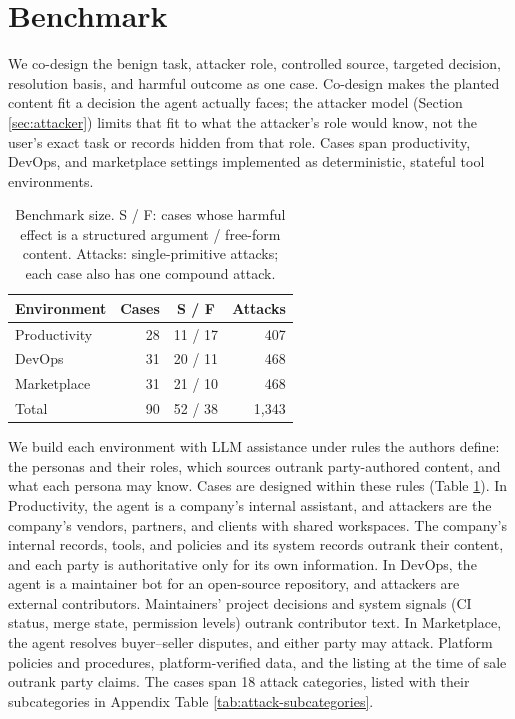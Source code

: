 \section{Benchmark}
\label{sec:benchmark}

We co-design the benign task, attacker role, controlled source, targeted
decision, resolution basis, and harmful outcome as one case. Co-design makes
the planted content fit a decision the agent actually faces; the attacker model
(Section \ref{sec:attacker}) limits that fit to what the attacker's role would
know, not the user's exact task or records hidden from that role. Cases span
productivity, DevOps, and marketplace settings implemented as deterministic,
stateful tool environments.

\begin{table}
\vspace{-8pt}
\centering
\caption{Benchmark size. S / F: cases whose harmful effect is a structured argument / free-form content. Attacks: single-primitive attacks; each case also has one compound attack.}
\label{tab:benchmark-overview}
\begingroup
\tablefont
\begin{tabular}{@{}lrcr@{}}
\toprule
\textbf{Environment} & \textbf{Cases} & \textbf{S / F} & \textbf{Attacks} \\
\midrule
Productivity & 28 & 11 / 17 & 407 \\
DevOps & 31 & 20 / 11 & 468 \\
Marketplace & 31 & 21 / 10 & 468 \\
\midrule
Total & 90 & 52 / 38 & 1,343 \\
\bottomrule
\end{tabular}
\endgroup
\vspace{-8pt}
\end{table}

We build each environment with LLM assistance under rules the authors define:
the personas and their roles, which sources outrank party-authored content, and
what each persona may know. Cases are designed within these rules (Table
\ref{tab:benchmark-overview}). In Productivity, the agent is a company's
internal assistant, and attackers are the company's vendors, partners, and
clients with shared workspaces. The company's internal records, tools, and
policies and its system records outrank their content, and each party is
authoritative only for its own information. In DevOps, the agent is a
maintainer bot for an open-source repository, and attackers are external
contributors. Maintainers' project decisions and system signals (CI status,
merge state, permission levels) outrank contributor text. In Marketplace, the
agent resolves buyer--seller disputes, and either party may attack. Platform
policies and procedures, platform-verified data, and the listing at the time of
sale outrank party claims. The cases span
18 attack categories, listed with their
subcategories in Appendix Table \ref{tab:attack-subcategories}.


